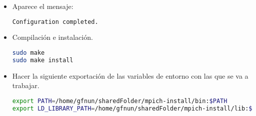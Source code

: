 \begin{itemize}
\item Aparece el mensaje:

\begin{lstlisting}[language=bash,style=mystyle2]    
Configuration completed.
\end{lstlisting} 



\item Compilación e instalación.

\begin{lstlisting}[language=bash,style=mystyle]      
sudo make
sudo make install
\end{lstlisting} 


\item Hacer la siguiente exportación de las variables de entorno con las que se va a trabajar.

\begin{lstlisting}[language=bash,style=mystyle]     
export PATH=/home/gfnun/sharedFolder/mpich-install/bin:$PATH
export LD_LIBRARY_PATH=/home/gfnun/sharedFolder/mpich-install/lib:$LD_LIBRARY_PATH 
\end{lstlisting} 



\end{itemize}